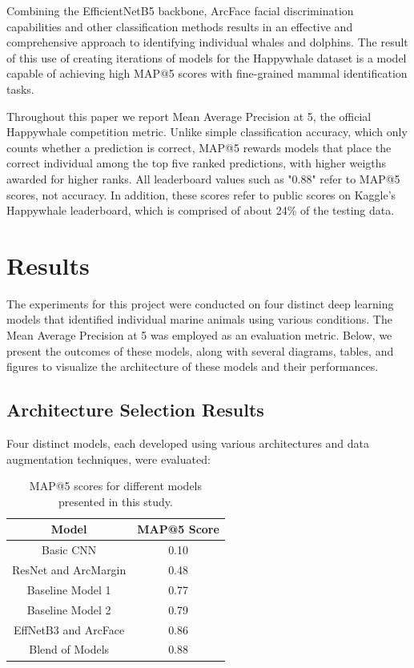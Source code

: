 \documentclass[twocolumn]{article}
\begin{document}
Combining the EfficientNetB5 backbone, ArcFace facial discrimination capabilities and other classification methods results in an effective and comprehensive approach to identifying individual whales and dolphins. The result of this use of creating iterations of models for the Happywhale dataset is a model capable of achieving high MAP@5 scores with fine-grained mammal identification tasks.

Throughout this paper we report Mean Average Precision at 5, the official Happywhale competition metric. Unlike simple classification accuracy, which only counts whether a prediction is correct, MAP@5 rewards models that place the correct individual among the top five ranked predictions, with higher weigths awarded for higher ranks. All leaderboard values such as "0.88" refer to MAP@5 scores, not accuracy. In addition, these scores refer to public scores on Kaggle's Happywhale leaderboard, which is comprised of about 24\% of the testing data.

\section{Results}

The experiments for this project were conducted on four distinct deep learning models that identified individual marine animals using various conditions. The Mean Average Precision at 5 was employed as an evaluation metric. Below, we present the outcomes of these models, along with several diagrams, tables, and figures to visualize the architecture of these models and their performances.

\subsection{Architecture Selection Results}

Four distinct models, each developed using various architectures and data augmentation techniques, were evaluated:

\begin{table}[ht!]
\centering
\begin{tabular}{|c|c|}
\hline
\textbf{Model} & \textbf{MAP@5 Score}\\ 
\hline
Basic CNN & 0.10 \\ 
\hline
ResNet and ArcMargin & 0.48 \\ 
\hline
Baseline Model 1 & 0.77 \\
\hline
Baseline Model 2 & 0.79 \\
\hline
EffNetB3 and ArcFace& 0.86 \\ 
\hline
Blend of Models & 0.88 \\ 
\hline
\end{tabular}
\caption{MAP@5 scores for different models presented in this study.}
\label{tab:model_scores}
\end{table}
\end{document}
